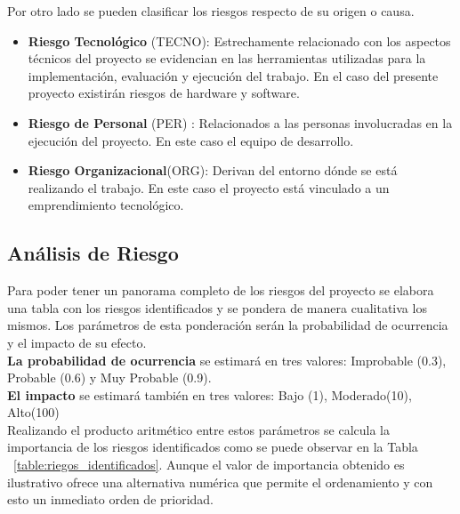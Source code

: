 Por otro lado se pueden clasificar los riesgos respecto de su origen o causa.

\begin{itemize}
	\item \textbf{Riesgo Tecnológico} (TECNO): Estrechamente relacionado con los aspectos técnicos del proyecto se evidencian en las herramientas utilizadas para la implementación, evaluación y ejecución del trabajo. En el caso del presente proyecto existirán riesgos de hardware y software.
	\item \textbf{Riesgo de Personal} (PER) : Relacionados a las personas involucradas en la ejecución del proyecto. En este caso el equipo de desarrollo.
	\item \textbf{Riesgo Organizacional}(ORG): Derivan del entorno dónde se está realizando el trabajo. En este caso el proyecto está vinculado a un emprendimiento tecnológico.
\end{itemize}

\subsection{Análisis de Riesgo}
Para poder tener un panorama completo de los riesgos del proyecto se elabora una tabla con los riesgos identificados y se pondera de manera cualitativa los mismos. Los parámetros de esta ponderación serán la probabilidad de ocurrencia y el impacto de su efecto.\\
\textbf{La probabilidad de ocurrencia} se estimará en tres valores: Improbable (0.3), Probable (0.6) y Muy Probable (0.9).\\
\textbf{El impacto} se estimará también en tres valores: Bajo (1), Moderado(10), Alto(100)\\
Realizando el producto aritmético entre estos parámetros se calcula la importancia de los riesgos identificados como se puede observar en la Tabla ~\ref{table:riegos_identificados}.
Aunque el valor de importancia obtenido es ilustrativo ofrece una alternativa numérica que permite el ordenamiento y con esto un inmediato orden de prioridad.

